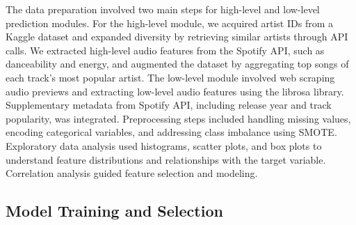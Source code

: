 \documentclass[11pt]{report}
\begin{document}
The data preparation involved two main steps for high-level and low-level prediction modules. For the high-level module, we acquired artist IDs from a Kaggle dataset and expanded diversity by retrieving similar artists through API calls. We extracted high-level audio features from the Spotify API, such as danceability and energy, and augmented the dataset by aggregating top songs of each track's most popular artist. The low-level module involved web scraping audio previews and extracting low-level audio features using the librosa library. Supplementary metadata from Spotify API, including release year and track popularity, was integrated. Preprocessing steps included handling missing values, encoding categorical variables, and addressing class imbalance using SMOTE. Exploratory data analysis used histograms, scatter plots, and box plots to understand feature distributions and relationships with the target variable. Correlation analysis guided feature selection and modeling.


\subsection{{Model Training and Selection}}
\end{document}
